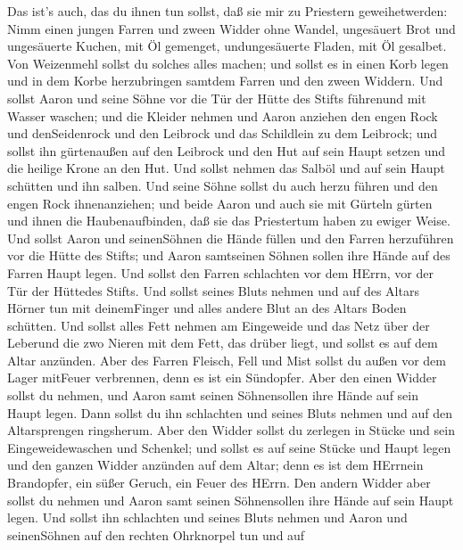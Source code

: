  Das ist's auch, das du ihnen tun sollst, daß sie mir zu
Priestern geweihetwerden: Nimm einen jungen Farren und zween Widder ohne
Wandel,  ungesäuert Brot und ungesäuerte Kuchen, mit Öl
gemenget, undungesäuerte Fladen, mit Öl gesalbet. Von Weizenmehl sollst
du solches alles machen;  und sollst es in einen Korb legen
und in dem Korbe herzubringen samtdem Farren und den zween Widdern.
 Und sollst Aaron und seine Söhne vor die Tür der Hütte des
Stifts führenund mit Wasser waschen;  und die Kleider nehmen
und Aaron anziehen den engen Rock und denSeidenrock und den Leibrock und
das Schildlein zu dem Leibrock; und sollst ihn gürtenaußen auf den
Leibrock  und den Hut auf sein Haupt setzen und die heilige
Krone an den Hut.  Und sollst nehmen das Salböl und auf sein
Haupt schütten und ihn salben.  Und seine Söhne sollst du
auch herzu führen und den engen Rock ihnenanziehen;  und
beide Aaron und auch sie mit Gürteln gürten und ihnen die
Haubenaufbinden, daß sie das Priestertum haben zu ewiger Weise. Und
sollst Aaron und seinenSöhnen die Hände füllen  und den
Farren herzuführen vor die Hütte des Stifts; und Aaron samtseinen Söhnen
sollen ihre Hände auf des Farren Haupt legen.  Und sollst
den Farren schlachten vor dem HErrn, vor der Tür der Hüttedes Stifts.
 Und sollst seines Bluts nehmen und auf des Altars Hörner
tun mit deinemFinger und alles andere Blut an des Altars Boden schütten.
 Und sollst alles Fett nehmen am Eingeweide und das Netz
über der Leberund die zwo Nieren mit dem Fett, das drüber liegt, und
sollst es auf dem Altar anzünden.  Aber des Farren Fleisch,
Fell und Mist sollst du außen vor dem Lager mitFeuer verbrennen, denn es
ist ein Sündopfer.  Aber den einen Widder sollst du nehmen,
und Aaron samt seinen Söhnensollen ihre Hände auf sein Haupt legen.
 Dann sollst du ihn schlachten und seines Bluts nehmen und
auf den Altarsprengen ringsherum.  Aber den Widder sollst
du zerlegen in Stücke und sein Eingeweidewaschen und Schenkel; und
sollst es auf seine Stücke und Haupt legen  und den ganzen
Widder anzünden auf dem Altar; denn es ist dem HErrnein Brandopfer, ein
süßer Geruch, ein Feuer des HErrn.  Den andern Widder aber
sollst du nehmen und Aaron samt seinen Söhnensollen ihre Hände auf sein
Haupt legen.  Und sollst ihn schlachten und seines Bluts
nehmen und Aaron und seinenSöhnen auf den rechten Ohrknorpel tun und auf
